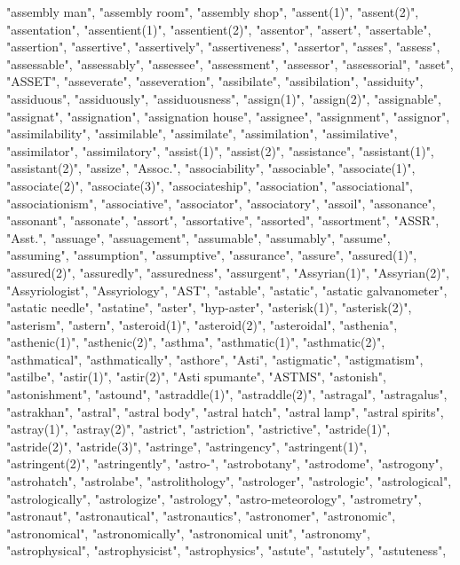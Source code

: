 "assembly man",
"assembly room",
"assembly shop",
"assent(1)",
"assent(2)",
"assentation",
"assentient(1)",
"assentient(2)",
"assentor",
"assert",
"assertable",
"assertion",
"assertive",
"assertively",
"assertiveness",
"assertor",
"asses",
"assess",
"assessable",
"assessably",
"assessee",
"assessment",
"assessor",
"assessorial",
"asset",
"ASSET",
"asseverate",
"asseveration",
"assibilate",
"assibilation",
"assiduity",
"assiduous",
"assiduously",
"assiduousness",
"assign(1)",
"assign(2)",
"assignable",
"assignat",
"assignation",
"assignation house",
"assignee",
"assignment",
"assignor",
"assimilability",
"assimilable",
"assimilate",
"assimilation",
"assimilative",
"assimilator",
"assimilatory",
"assist(1)",
"assist(2)",
"assistance",
"assistant(1)",
"assistant(2)",
"assize",
"Assoc.",
"associability",
"associable",
"associate(1)",
"associate(2)",
"associate(3)",
"associateship",
"association",
"associational",
"associationism",
"associative",
"associator",
"associatory",
"assoil",
"assonance",
"assonant",
"assonate",
"assort",
"assortative",
"assorted",
"assortment",
"ASSR",
"Asst.",
"assuage",
"assuagement",
"assumable",
"assumably",
"assume",
"assuming",
"assumption",
"assumptive",
"assurance",
"assure",
"assured(1)",
"assured(2)",
"assuredly",
"assuredness",
"assurgent",
"Assyrian(1)",
"Assyrian(2)",
"Assyriologist",
"Assyriology",
"AST",
"astable",
"astatic",
"astatic galvanometer",
"astatic needle",
"astatine",
"aster",
"hyp-aster",
"asterisk(1)",
"asterisk(2)",
"asterism",
"astern",
"asteroid(1)",
"asteroid(2)",
"asteroidal",
"asthenia",
"asthenic(1)",
"asthenic(2)",
"asthma",
"asthmatic(1)",
"asthmatic(2)",
"asthmatical",
"asthmatically",
"asthore",
"Asti",
"astigmatic",
"astigmatism",
"astilbe",
"astir(1)",
"astir(2)",
"Asti spumante",
"ASTMS",
"astonish",
"astonishment",
"astound",
"astraddle(1)",
"astraddle(2)",
"astragal",
"astragalus",
"astrakhan",
"astral",
"astral body",
"astral hatch",
"astral lamp",
"astral spirits",
"astray(1)",
"astray(2)",
"astrict",
"astriction",
"astrictive",
"astride(1)",
"astride(2)",
"astride(3)",
"astringe",
"astringency",
"astringent(1)",
"astringent(2)",
"astringently",
"astro-",
"astrobotany",
"astrodome",
"astrogony",
"astrohatch",
"astrolabe",
"astrolithology",
"astrologer",
"astrologic",
"astrological",
"astrologically",
"astrologize",
"astrology",
"astro-meteorology",
"astrometry",
"astronaut",
"astronautical",
"astronautics",
"astronomer",
"astronomic",
"astronomical",
"astronomically",
"astronomical unit",
"astronomy",
"astrophysical",
"astrophysicist",
"astrophysics",
"astute",
"astutely",
"astuteness",
